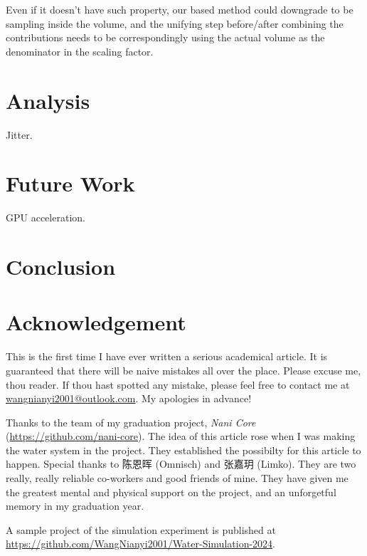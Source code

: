 \documentclass{article}
\begin{document}
Even if it doesn't have such property, our based method could downgrade to be sampling inside the volume, and the unifying step before/after combining the contributions needs to be correspondingly using the actual volume as the denominator in the scaling factor.

\section{Analysis}

Jitter.

\section{Future Work}

GPU acceleration.

\section{Conclusion}

\section*{Acknowledgement}
\begin{redacted}
This is the first time I have ever written a serious academical article.
It is guaranteed that there will be naive mistakes all over the place.
Please excuse me, thou reader.
If thou hast spotted any mistake, please feel free to contact me at \url{wangnianyi2001@outlook.com}.
My apologies in advance!

Thanks to the team of my graduation project, \emph{Nani Core} (\url{https://github.com/nani-core}).
The idea of this article rose when I was making the water system in the project.
They established the possibilty for this article to happen.
Special thanks to 陈恩晖 (Omnisch) and 张嘉玥 (Limko).
They are two really, really reliable co-workers and good friends of mine.
They have given me the greatest mental and physical support on the project, and an unforgetful memory in my graduation year.

A sample project of the simulation experiment is published at \url{https://github.com/WangNianyi2001/Water-Simulation-2024}.
\end{redacted}

\printbibliography
\end{document}
